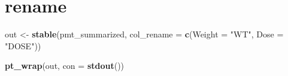 \documentclass[
]{article}
\newenvironment{Shaded}{\begin{snugshade}}{\end{snugshade}}
\newcommand{\ControlFlowTok}[1]{\textcolor[rgb]{0.13,0.29,0.53}{\textbf{#1}}}
\newcommand{\DataTypeTok}[1]{\textcolor[rgb]{0.13,0.29,0.53}{#1}}
\newcommand{\KeywordTok}[1]{\textcolor[rgb]{0.13,0.29,0.53}{\textbf{#1}}}
\newcommand{\NormalTok}[1]{#1}
\newcommand{\OperatorTok}[1]{\textcolor[rgb]{0.81,0.36,0.00}{\textbf{#1}}}
\newcommand{\StringTok}[1]{\textcolor[rgb]{0.31,0.60,0.02}{#1}}
\begin{document}
\begin{Shaded}
\end{Shaded}

\clearpage

\hypertarget{rename}{%
\section{rename}\label{rename}}

\begin{Shaded}
\begin{Highlighting}[]
\NormalTok{out <-}\StringTok{ }\KeywordTok{stable}\NormalTok{(pmt_summarized, }\DataTypeTok{col_rename =} \KeywordTok{c}\NormalTok{(}\DataTypeTok{Weight =} \StringTok{"WT"}\NormalTok{, }\DataTypeTok{Dose =} \StringTok{"DOSE"}\NormalTok{))}

\KeywordTok{pt_wrap}\NormalTok{(out, }\DataTypeTok{con =} \KeywordTok{stdout}\NormalTok{()) }
\end{Highlighting}
\end{Shaded}
\end{document}
